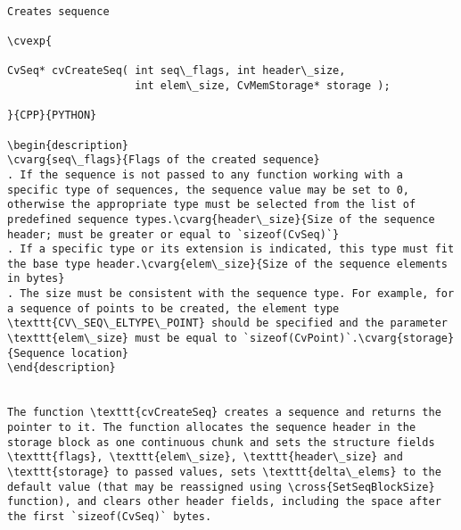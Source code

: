\begin{verbatim}

Creates sequence

\cvexp{

CvSeq* cvCreateSeq( int seq\_flags, int header\_size,
                    int elem\_size, CvMemStorage* storage );

}{CPP}{PYTHON}

\begin{description}
\cvarg{seq\_flags}{Flags of the created sequence}
. If the sequence is not passed to any function working with a specific type of sequences, the sequence value may be set to 0, otherwise the appropriate type must be selected from the list of predefined sequence types.\cvarg{header\_size}{Size of the sequence header; must be greater or equal to `sizeof(CvSeq)`}
. If a specific type or its extension is indicated, this type must fit the base type header.\cvarg{elem\_size}{Size of the sequence elements in bytes}
. The size must be consistent with the sequence type. For example, for a sequence of points to be created, the element type \texttt{CV\_SEQ\_ELTYPE\_POINT} should be specified and the parameter \texttt{elem\_size} must be equal to `sizeof(CvPoint)`.\cvarg{storage}{Sequence location}
\end{description}


The function \texttt{cvCreateSeq} creates a sequence and returns the pointer to it. The function allocates the sequence header in the storage block as one continuous chunk and sets the structure fields \texttt{flags}, \texttt{elem\_size}, \texttt{header\_size} and \texttt{storage} to passed values, sets \texttt{delta\_elems} to the default value (that may be reassigned using \cross{SetSeqBlockSize} function), and clears other header fields, including the space after the first `sizeof(CvSeq)` bytes.


\end{verbatim}
